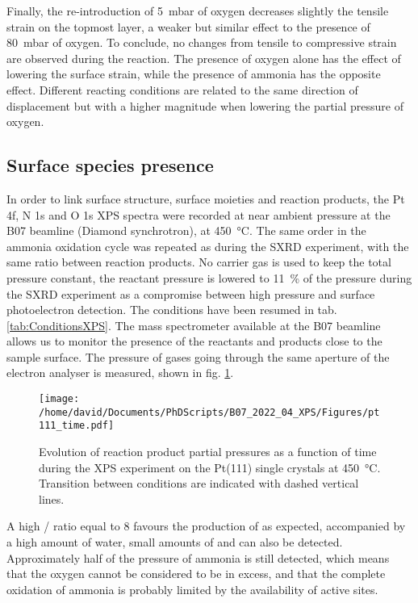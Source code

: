 Finally, the re-introduction of \qty{5}{\milli\bar} of oxygen decreases slightly the tensile strain on the topmost layer, a weaker but similar effect to the presence of \qty{80}{\milli\bar} of oxygen.
To conclude, no changes from tensile to compressive strain are observed during the reaction.
The presence of oxygen alone has the effect of lowering the surface strain, while the presence of ammonia has the opposite effect.
Different reacting conditions are related to the same direction of displacement but with a higher magnitude when lowering the partial pressure of oxygen.

\subsection{Surface species presence}

In order to link surface structure, surface moieties and reaction products, the Pt 4f, N 1s and O 1s XPS spectra were recorded at near ambient pressure at the B07 beamline (Diamond synchrotron), at \qty{450}{\degreeCelsius}.
The same order in the ammonia oxidation cycle was repeated as during the SXRD experiment, with the same ratio between reaction products.
No carrier gas is used to keep the total pressure constant, the reactant pressure is lowered to \qty{11}{\percent} of the pressure during the SXRD experiment as a compromise between high pressure and surface photoelectron detection.
The conditions have been resumed in tab. \ref{tab:ConditionsXPS}.
The mass spectrometer available at the B07 beamline allows us to monitor the presence of the reactants and products close to the sample surface.
The pressure of gases going through the same aperture of the electron analyser is measured, shown in fig. \ref{fig:XPS111RGA}.

\begin{figure}[!htb]
    \centering
    \texttt{[image: /home/david/Documents/PhDScripts/B07\_2022\_04\_XPS/Figures/pt111\_time.pdf]}
    \caption{
        Evolution of reaction product partial pressures as a function of time during the XPS experiment on the Pt(111) single crystals at \qty{450}{\degreeCelsius}.
        Transition between conditions are indicated with dashed vertical lines.
    }
    \label{fig:XPS111RGA}
\end{figure}

A high / ratio equal to \num{8} favours the production of  as expected, accompanied by a high amount of water, small amounts of  and  can also be detected.
Approximately half of the pressure of ammonia is still detected, which means that the oxygen cannot be considered to be in excess, and that the complete oxidation of ammonia is probably limited by the availability of active sites.

